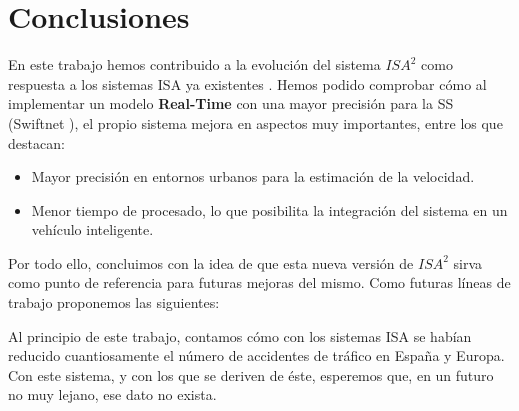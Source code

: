 \chapter{Conclusiones}

En este trabajo hemos contribuido a la evolución del sistema $ISA^{2}$ como respuesta a los sistemas \ac{ISA} ya existentes \cite{isa2}. Hemos podido comprobar cómo al implementar un modelo \textbf{Real-Time} con una mayor precisión para la \ac{SS} (Swiftnet \cite{swiftnet}), el propio sistema mejora en aspectos muy importantes, entre los que destacan:

\begin{itemize}
\item Mayor precisión en entornos urbanos para la estimación de la velocidad.
\item Menor tiempo de procesado, lo que posibilita la integración del sistema en un vehículo inteligente.
\end{itemize}


Por todo ello, concluimos con la idea de que esta nueva versión de $ISA^{2}$ sirva como punto de referencia para futuras mejoras del mismo. Como futuras líneas de trabajo proponemos las siguientes:

Al principio de este trabajo, contamos cómo con los sistemas \ac{ISA} se habían reducido cuantiosamente el número de accidentes de tráfico en España y Europa. Con este sistema, y con los que se deriven de éste, esperemos que, en un futuro no muy lejano, ese dato no exista.
